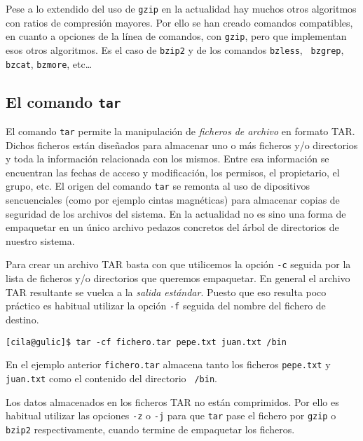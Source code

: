 Pese  a lo  extendido  del uso  de  {\tt gzip}  en  la actualidad  hay
muchos otros  algoritmos con  ratios de  compresión mayores.  Por ello
se  han  creado comandos  compatibles,  en  cuanto  a opciones  de  la
línea  de  comandos,  con  {\tt   gzip},  pero  que  implementan  esos
otros  algoritmos. Es  el  caso  de {\tt  bzip2}
y   de   los   comandos  {\tt   bzless},   {\tt
bzgrep},   {\tt   bzcat},
{\tt bzmore}, etc\dots

\subsection{El comando {\tt tar}}

El  comando {\tt  tar} permite  la  manipulación de  {\em ficheros  de
archivo} en  formato {\sf TAR}.  Dichos ficheros están  diseñados para
almacenar uno  o más  ficheros y/o directorios  y toda  la información
relacionada con  los mismos. Entre  esa información se  encuentran las
fechas  de acceso  y modificación,  los permisos,  el propietario,  el
grupo,  etc. El  origen del  comando {\tt  tar} se  remonta al  uso de
dipositivos sencuenciales  (como por  ejemplo cintas  magnéticas) para
almacenar  copias de  seguridad de  los  archivos del  sistema. En  la
actualidad no  es sino  una forma  de empaquetar  en un  único archivo
pedazos concretos del árbol de directorios de nuestro sistema.

Para crear  un archivo {\sf  TAR} basta  con que utilicemos  la opción
{\tt -c} seguida por la lista de ficheros y/o directorios que queremos
empaquetar. En general el archivo {\sf TAR} resultante se vuelca  a la
{\em  salida  estándar}.  Puesto  que eso  resulta  poco  práctico  es
habitual utilizar la opción {\tt -f} seguida del nombre del fichero de
destino.

\begin{verbatim}
[cila@gulic]$ tar -cf fichero.tar pepe.txt juan.txt /bin
\end{verbatim}

En el ejemplo  anterior {\tt fichero.tar} almacena  tanto los ficheros
{\tt pepe.txt} y {\tt juan.txt}  como el contenido del directorio {\tt
/bin}.

Los datos almacenados en los  ficheros {\sf TAR} no están comprimidos.
Por  ello es  habitual  utilizar  las opciones  {\tt  -z}  o {\tt  -j}
para  que {\tt  tar} pase  el  fichero por  {\tt gzip}  o {\tt  bzip2}
respectivamente, cuando termine de empaquetar los ficheros.


